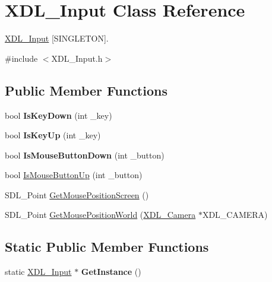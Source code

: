 \hypertarget{class_x_d_l___input}{\section{X\-D\-L\-\_\-\-Input Class Reference}
\label{class_x_d_l___input}
}


\hyperlink{class_x_d_l___input}{X\-D\-L\-\_\-\-Input} \mbox{[}S\-I\-N\-G\-L\-E\-T\-O\-N\mbox{]}.  




{\ttfamily \#include $<$X\-D\-L\-\_\-\-Input.\-h$>$}

\subsection*{Public Member Functions}
\begin{DoxyCompactItemize}
\item 
\hypertarget{class_x_d_l___input_ae8de8b0399f53648a4a1c1c9dcb41a22}{bool {\bfseries Is\-Key\-Down} (int \-\_\-key)}\label{class_x_d_l___input_ae8de8b0399f53648a4a1c1c9dcb41a22}

\item 
\hypertarget{class_x_d_l___input_aad0207a7d0232c69f3c086ae81533857}{bool {\bfseries Is\-Key\-Up} (int \-\_\-key)}\label{class_x_d_l___input_aad0207a7d0232c69f3c086ae81533857}

\item 
\hypertarget{class_x_d_l___input_abb3ecefb33c51d0ace63d145110f75c5}{bool {\bfseries Is\-Mouse\-Button\-Down} (int \-\_\-button)}\label{class_x_d_l___input_abb3ecefb33c51d0ace63d145110f75c5}

\item 
bool \hyperlink{class_x_d_l___input_a2b7295d8c171019eee81ea81144277a9}{Is\-Mouse\-Button\-Up} (int \-\_\-button)
\item 
S\-D\-L\-\_\-\-Point \hyperlink{class_x_d_l___input_a0e7fdfa0f3562df12ecc3725e65b35a9}{Get\-Mouse\-Position\-Screen} ()
\item 
S\-D\-L\-\_\-\-Point \hyperlink{class_x_d_l___input_a70171884eb0602c67bb2c4f659596c48}{Get\-Mouse\-Position\-World} (\hyperlink{class_x_d_l___camera}{X\-D\-L\-\_\-\-Camera} $\ast$X\-D\-L\-\_\-\-C\-A\-M\-E\-R\-A)
\end{DoxyCompactItemize}
\subsection*{Static Public Member Functions}
\begin{DoxyCompactItemize}
\item 
\hypertarget{class_x_d_l___input_a43c817092eb80d014759187717884461}{static \hyperlink{class_x_d_l___input}{X\-D\-L\-\_\-\-Input} $\ast$ {\bfseries Get\-Instance} ()}\label{class_x_d_l___input_a43c817092eb80d014759187717884461}

\end{DoxyCompactItemize}
